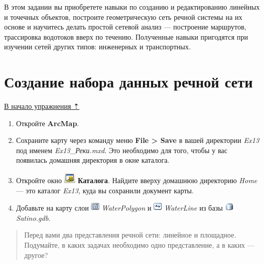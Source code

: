 \documentclass[]{book}
\theoremstyle{definition}
\theoremstyle{definition}
\theoremstyle{definition}
\theoremstyle{remark}
\begin{document}
В этом задании вы приобретете навыки по созданию и редактированию
линейных и точечных объектов, построите геометрическую сеть речной
системы на их основе и научитесь делать простой сетевой анализ ---
построение маршрутов, трассировка водотоков вверх по течению. Полученные
навыки пригодятся при изучении сетей других типов: инженерных и
транспортных.

\hypertarget{network-hydro-dataset}{%
\section{Создание набора данных речной
сети}\label{network-hydro-dataset}}

\protect\hyperlink{network-modeling-hydro}{В начало упражнения ⇡}

\begin{enumerate}
\def\labelenumi{\arabic{enumi}.}
\item
  Откройте \textbf{ArcMap}.
\item
  Сохраните карту через команду меню \textbf{File \textgreater{} Save} в
  вашей директории \emph{Ex13} под именем \emph{Ex13\_Реки.mxd}. Это
  необходимо для того, чтобы у вас появилась домашняя директория в окне
  каталога.
\item
  Откройте окно \includegraphics{images/Ex13/image2.png}
  \textbf{Каталога}. Найдите вверху домашнюю директорию \emph{Home} ---
  это каталог \emph{Ex13}, куда вы сохранили документ карты.
\item
  Добавьте на карту слои \includegraphics{images/Ex13/image3.png}
  \emph{WaterPolygon} и \includegraphics{images/Ex13/image4.png}
  \emph{WaterLine} из базы \includegraphics{images/Ex13/image5.png}
  \emph{Satino.gdb}.
\end{enumerate}

\begin{quote}
Перед вами два представления речной сети: линейное и площадное.
Подумайте, в каких задачах необходимо одно представление, а в каких ---
другое?
\end{quote}
\end{document}
